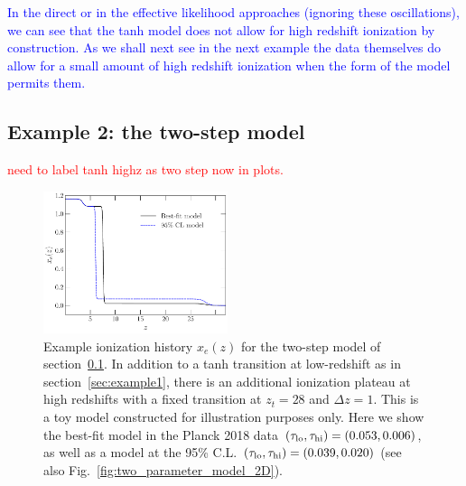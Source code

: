 \documentclass[prd,twocolumn,amsmath,amssymb,floatfix,superscriptaddress,nofootinbib]{revtex4-1}
\newcommand{\refsec}[1]{section~\ref{sec:#1}}
\newcommand{\tauhi}{\tau_{\rm hi}}
\newcommand{\taulo}{\tau_{\rm lo}}
\newcommand{\wh}[1]{\textcolor{blue}{#1}}
\newcommand{\ch}[1]{\textcolor{red}{#1}}
\begin{document}
\wh{
In the direct or in the effective likelihood approaches (ignoring these oscillations),
we can see that the  tanh model does not allow for high redshift ionization by construction.   As we shall next see in the next example the data themselves do allow for a small amount of high redshift ionization when the form of the model permits them.
}



\subsection{Example 2: the two-step model}
\label{sec:example2}

\ch{need to label tanh highz as two step now in plots.}

\begin{figure}
\includegraphics[width=0.48\textwidth]{paper/plots/plot_xe_tanh_highz.pdf}
\caption{Example ionization history $x_e(z)$ for the two-step model of \refsec{example2}. In addition to a tanh transition at low-redshift as in \refsec{example1}, there is an additional ionization plateau at high redshifts with a fixed transition at $z_t = 28$ and $\Delta z = 1$. This is a toy model constructed for illustration purposes only. Here we show the best-fit model in the Planck 2018 data $(\taulo, \tauhi) = (0.053, 0.006)$, as well as  a model at the 95\% C.L. $(\taulo, \tauhi) = (0.039, 0.020)$ (see also Fig.~\ref{fig:two_parameter_model_2D}).}
\label{fig:two_step_model}
\end{figure}

%
%
\end{document}
